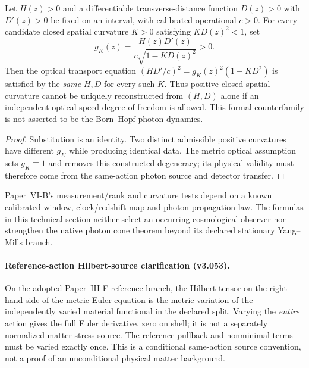 \documentclass[12pt,a4paper]{article}
\begin{document}
\begin{proposition}
\label{p6c:prop:v358-optical-speed-counterfamily}
Let $H(z)>0$ and a differentiable transverse-distance function
$D(z)>0$ with $D'(z)>0$ be fixed on an interval, with calibrated
operational $c>0$.  For every candidate closed spatial curvature
$K>0$ satisfying $KD(z)^2<1$, set
\[
 g_K(z)=\frac{H(z)D'(z)}{c\sqrt{1-KD(z)^2}}>0.
\]
Then the optical transport equation
$(HD'/c)^2=g_K(z)^2(1-KD^2)$ is satisfied by the \emph{same}
$H,D$ for every such $K$.  Thus positive closed spatial curvature
cannot be uniquely reconstructed from $(H,D)$ alone if an independent
optical-speed degree of freedom is allowed.  This formal counterfamily
is not asserted to be the Born--Hopf photon dynamics.
\end{proposition}
\begin{proof}
Substitution is an identity.  Two distinct admissible positive
curvatures have different $g_K$ while producing identical data.
The metric optical assumption sets $g_K\equiv1$ and removes this
constructed degeneracy; its physical validity must therefore come
from the same-action photon source and detector transfer.
\end{proof}

\begin{remark}
\label{p6c:rem:v358-observer-clock-frontier}
Paper~VI-B's measurement/rank and curvature tests depend on a known
calibrated window, clock/redshift map and photon propagation law.
The formulas in this technical section neither select an occurring
cosmological observer nor strengthen the native photon cone theorem
beyond its declared stationary Yang--Mills branch.
\end{remark}


\paragraph{Reference-action Hilbert-source clarification (v3.053).}
On the adopted Paper~III-F reference branch, the Hilbert tensor on the
right-hand side of the metric Euler equation is the metric variation
of the independently varied material functional in the declared split.
Varying the \emph{entire} action gives the full Euler derivative, zero
on shell; it is not a separately normalized matter stress source.
The reference pullback and nonminimal terms must be varied exactly once.
This is a conditional same-action source convention, not a proof of an
unconditional physical matter background.
\end{document}
